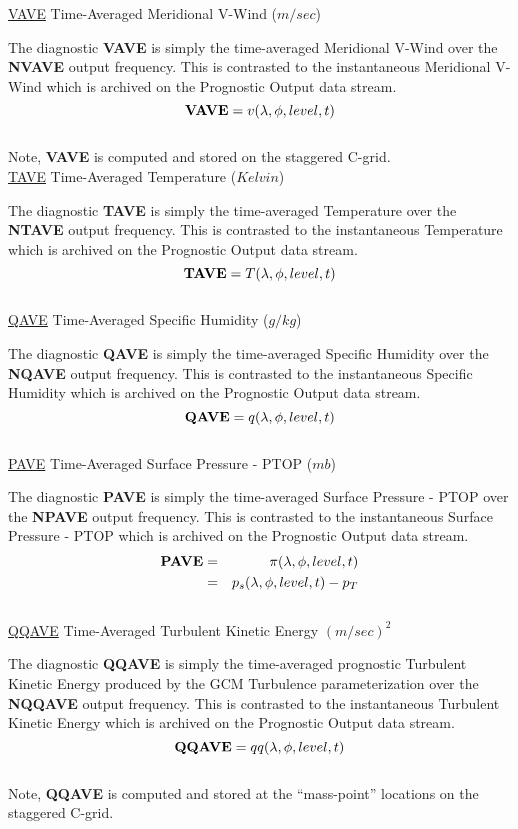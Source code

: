 \noindent
{ \underline {VAVE} Time-Averaged Meridional V-Wind ($m/sec$) }

\noindent
The diagnostic {\bf VAVE} is simply the time-averaged Meridional V-Wind over
the {\bf NVAVE} output frequency.  This is contrasted to the instantaneous
Meridional V-Wind which is archived on the Prognostic Output data stream.
\[
{\bf VAVE} = v(\lambda, \phi, level , t)
\]
\\
Note, {\bf VAVE} is computed and stored on the staggered C-grid.
\\

\noindent
{ \underline {TAVE} Time-Averaged Temperature ($Kelvin$) }

\noindent
The diagnostic {\bf TAVE} is simply the time-averaged Temperature over
the {\bf NTAVE} output frequency.  This is contrasted to the instantaneous
Temperature which is archived on the Prognostic Output data stream.
\[
{\bf TAVE} = T(\lambda, \phi, level , t)
\]
\\

\noindent
{ \underline {QAVE} Time-Averaged Specific Humidity ($g/kg$) }

\noindent
The diagnostic {\bf QAVE} is simply the time-averaged Specific Humidity over
the {\bf NQAVE} output frequency.  This is contrasted to the instantaneous
Specific Humidity which is archived on the Prognostic Output data stream.
\[
{\bf QAVE} = q(\lambda, \phi, level , t)
\]
\\

\noindent
{ \underline {PAVE} Time-Averaged Surface Pressure - PTOP ($mb$) }

\noindent
The diagnostic {\bf PAVE} is simply the time-averaged Surface Pressure - PTOP over
the {\bf NPAVE} output frequency.  This is contrasted to the instantaneous
Surface Pressure - PTOP which is archived on the Prognostic Output data stream.
\begin{eqnarray*}
{\bf PAVE} & =  & \pi(\lambda, \phi, level , t) \\
           & =  & p_s(\lambda, \phi, level , t) - p_T
\end{eqnarray*}
\\

 
\noindent
{ \underline {QQAVE} Time-Averaged Turbulent Kinetic Energy $(m/sec)^2$ }
 
\noindent
The diagnostic {\bf QQAVE} is simply the time-averaged prognostic Turbulent Kinetic Energy 
produced by the GCM Turbulence parameterization over
the {\bf NQQAVE} output frequency.  This is contrasted to the instantaneous
Turbulent Kinetic Energy which is archived on the Prognostic Output data stream.
\[
{\bf QQAVE} = qq(\lambda, \phi, level , t)
\]
\\
Note, {\bf QQAVE} is computed and stored at the ``mass-point'' locations on the staggered C-grid.
\\
 
